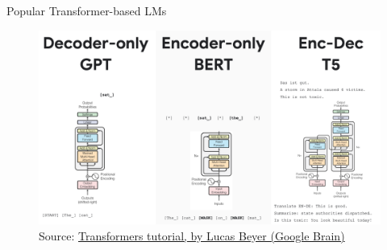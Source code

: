 \documentclass[9pt]{beamer}
\begin{document}
\begin{frame}{Popular Transformer-based LMs}
    \begin{figure}
        \centering
        \includegraphics[width=\textwidth]{img/transformer-flavors.png}
        \caption{Source: \href{https://t.co/aYfnVKPDjT}{Transformers tutorial, by Lucas Beyer (Google Brain)}}
        \label{fig:enter-label}
    \end{figure}
\end{frame}


\end{document}

